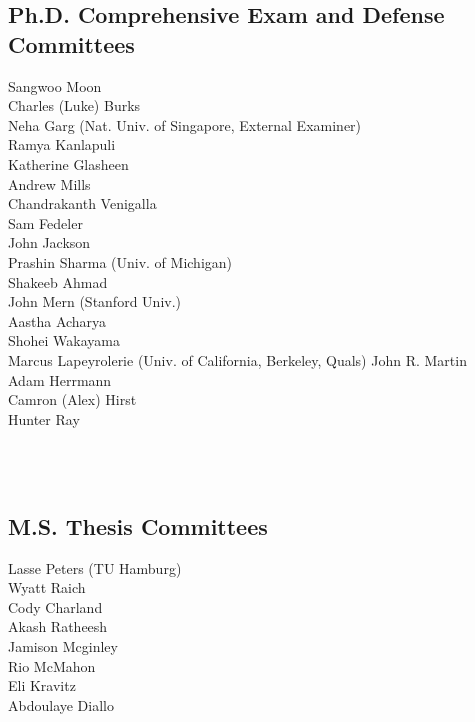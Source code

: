 \documentclass[10pt,roman]{moderncv}
\begin{document}
\begin{minipage}{\textwidth}
\subsection{Ph.D. Comprehensive Exam and Defense Committees}
\begin{multicols}{2}
    \small
    Sangwoo Moon\\
    Charles (Luke) Burks\\
    Neha Garg (Nat. Univ. of Singapore, External Examiner)\\
    Ramya Kanlapuli\\
    Katherine Glasheen\\
    Andrew Mills\\
    Chandrakanth Venigalla\\
    Sam Fedeler\\
    John Jackson\\
    Prashin Sharma (Univ. of Michigan)\\
    Shakeeb Ahmad\\
    John Mern (Stanford Univ.)\\
    Aastha Acharya\\
    Shohei Wakayama\\
    Marcus Lapeyrolerie (Univ. of California, Berkeley, Quals)
    John R. Martin\\
    Adam Herrmann\\
    Camron (Alex) Hirst\\
    Hunter Ray\\
\end{multicols}
\end{minipage}\\
\\

\subsection{M.S. Thesis Committees}
\begin{multicols}{2}
    \small
    Lasse Peters (TU Hamburg)\\
    Wyatt Raich\\
    Cody Charland\\
    Akash Ratheesh\\
    Jamison Mcginley\\
    Rio McMahon\\
    Eli Kravitz\\
    Abdoulaye Diallo
\end{multicols}
\end{document}

